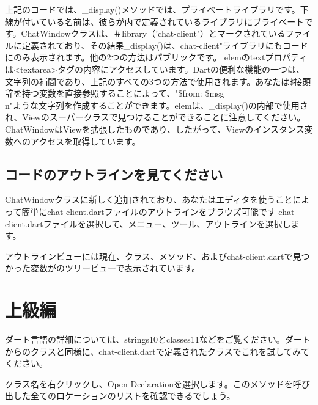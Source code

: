 上記のコードでは、\_display()メソッドでは、プライベートライブラリです。下線が付いている名前は、彼らが内で定義されているライブラリにプライベートです。ChatWindowクラスは、＃library（'chat-client"）とマークされているファイルに定義されており、その結果\_display()は、chat-client"ライブラリにもコードにのみ表示されます。他の2つの方法はパブリックです。
elemのtextプロパティは<textarea>タグの内容にアクセスしています。Dartの便利な機能の一つは、文字列の補間であり、上記のすべての3つの方法で使用されます。あなたは\$接頭辞を持つ変数を直接参照することによって、"\$from: \$msg\\n"ような文字列を作成することができます。elemは、\_display()の内部で使用され、Viewのスーパークラスで見つけることができることに注意してください。ChatWindowはViewを拡張したものであり、したがって、Viewのインスタンス変数へのアクセスを取得しています。

\subsection{コードのアウトラインを見てください}

ChatWindowクラスに新しく追加されており、あなたはエディタを使うことによって簡単にchat-client.dartファイルのアウトラインをブラウズ可能です
chat-client.dartファイルを選択して、メニュー、ツール、アウトラインを選択します。


アウトラインビューには現在、クラス、メソッド、およびchat-client.dartで見つかった変数がのツリービューで表示されています。


\section{上級編}

ダート言語の詳細については、strings10とclasses11などをご覧ください。ダートからのクラスと同様に、chat-client.dartで定義されたクラスでこれを試してみてください。


クラス名を右クリックし、Open Declarationを選択します。このメソッドを呼び出した全てのロケーションのリストを確認できるでしょう。


\clearpage
